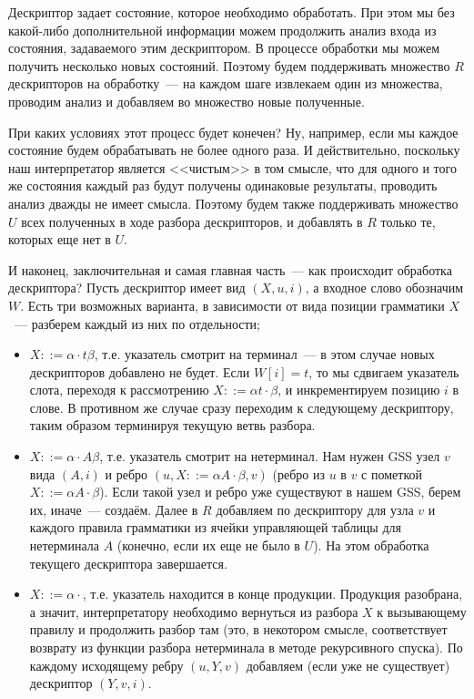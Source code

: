 Дескриптор задает состояние, которое необходимо обработать. При этом мы без какой-либо дополнительной информации можем продолжить анализ входа из состояния, задаваемого этим дескриптором. В процессе обработки мы можем получить несколько новых состояний. Поэтому будем поддерживать множество $ R $ дескрипторов на обработку~--- на каждом шаге извлекаем один из множества, проводим анализ и добавляем во множество новые полученные.

При каких условиях этот процесс будет конечен? Ну, например, если мы каждое состояние будем обрабатывать не более одного раза. И действительно, поскольку наш интерпретатор является <<чистым>> в том смысле, что для одного и того же состояния каждый раз будут получены одинаковые результаты, проводить анализ дважды не имеет смысла. Поэтому будем также поддерживать множество $ U $ всех полученных в ходе разбора дескрипторов, и добавлять в $ R $ только те, которых еще нет в $ U $.

И наконец, заключительная и самая главная часть~--- как происходит обработка дескриптора?
Пусть дескриптор имеет вид $ (X, u, i) $, а входное слово обозначим $ W $. Есть три возможных варианта, в зависимости от вида позиции грамматики $ X $~--- разберем каждый из них по отдельности;

\begin{itemize}
  \item $ X ::= \alpha \cdot t \beta $, т.е. указатель смотрит на терминал~--- в этом случае новых дескрипторов добавлено не будет. Если $ W[i] = t $, то мы сдвигаем указатель слота, переходя к рассмотрению $ X ::= \alpha t \cdot \beta $, и инкрементируем позицию $ i $ в слове. В противном же случае сразу переходим к следующему дескриптору, таким образом терминируя текущую ветвь разбора.

  \item $ X ::= \alpha \cdot A \beta $, т.е. указатель смотрит на нетерминал. Нам нужен GSS узел $ v $ вида $ (A, i) $ и ребро $ (u, X ::= \alpha A \cdot \beta, v) $ (ребро из $ u $ в $ v $ с пометкой $ X ::= \alpha A \cdot \beta $). Если такой узел и ребро уже существуют в нашем GSS, берем их, иначе~--- создаём. Далее в $ R $ добавляем по дескриптору для узла $ v $ и каждого правила грамматики из ячейки управляющей таблицы для нетерминала $ A $ (конечно, если их еще не было в $ U $). На этом обработка текущего дескриптора завершается.

  \item $ X ::= \alpha \cdot $, т.е. указатель находится в конце продукции. Продукция разобрана, а значит, интерпретатору необходимо вернуться из разбора $ X $ к вызывающему правилу и продолжить разбор там (это, в некотором смысле, соответствует возврату из функции разбора нетерминала в методе рекурсивного спуска). По каждому исходящему ребру $ (u, Y, v) $ добавляем (если уже не существует) дескриптор $(Y, v, i)$.
\end{itemize}

